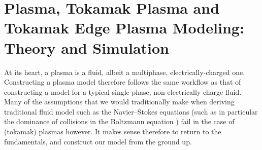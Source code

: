 \section{Plasma, Tokamak Plasma and Tokamak Edge Plasma Modeling: Theory and Simulation}

    At its heart, a plasma is a fluid, albeit a multiphase, electrically-charged one. Constructing a plasma model therefore follows the same workflow as that of constructing a model for a typical single phase, non-electrically-charge fluid. Many of the assumptions that we would traditionally make when deriving traditional fluid model such as the Navier–Stokes equations (such as in particular the dominance of collisions in the Boltzmann equation \BA{[Ref]}) fail in the case of (tokamak) plasmas however. It makes sense therefore to return to the fundamentals, and construct our model from the ground up.



    
    
    
